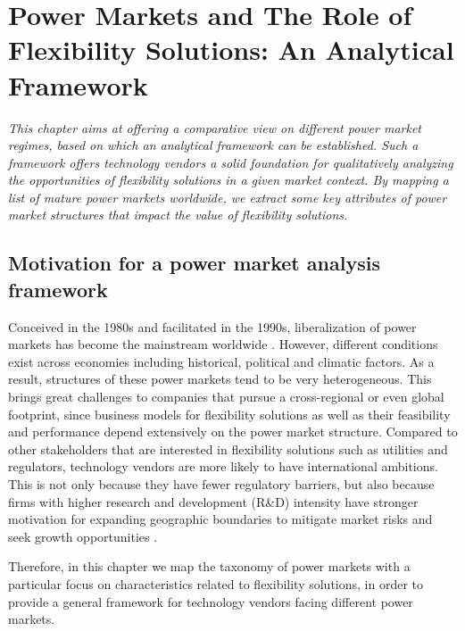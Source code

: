 \chapter{Power Markets and The Role of Flexibility Solutions: An Analytical Framework}
\label{ch:market}
\textit{This chapter aims at offering a comparative view on different power market regimes, based on which an analytical framework can be established. Such a framework offers technology vendors a solid foundation for qualitatively analyzing the opportunities of flexibility solutions in a given market context. By mapping a list of mature power markets worldwide, we extract some key attributes of power market structures that impact the value of flexibility solutions.}

\section{Motivation for a power market analysis framework}

Conceived in the 1980s and facilitated in the 1990s, liberalization of power markets has become the mainstream worldwide \cite{Srivastava2011,Ranci2013,Vagliasindi2013}. However, different conditions exist across economies including historical, political and climatic factors. As a result, structures of these power markets tend to be very heterogeneous. %
This brings great challenges to companies that pursue a cross-regional or even global footprint, since business models for flexibility solutions as well as their feasibility and performance depend extensively on the power market structure. Compared to other stakeholders that are interested in flexibility solutions such as utilities and regulators, technology vendors are more likely to have international ambitions. This is not only because they have fewer regulatory barriers, but also because firms with higher research and development (R\&D) intensity have stronger motivation for expanding geographic boundaries to mitigate market risks and seek growth opportunities \cite{Brouthers2007}.

Therefore, in this chapter we map the taxonomy of power markets with a particular focus on characteristics related to flexibility solutions, in order to provide a general framework for technology vendors facing different power markets.

